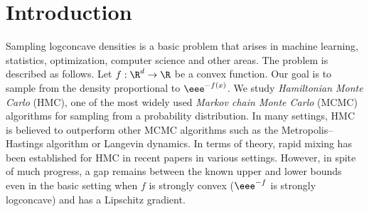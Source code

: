 
%
%
%
















\section{Introduction}

Sampling logconcave densities is a basic problem that arises in machine learning, statistics, optimization, computer science and other areas. The problem is described as follows. Let $f: \R^d \to \R$ be a convex function. Our goal is to sample from the density proportional to $\eee^{-f(x)}$. We study \textit{Hamiltonian Monte Carlo} (HMC), one of the most
%
widely used   %
\textit{Markov chain Monte Carlo} (MCMC) algorithms for sampling from a probability distribution. In many settings, HMC is believed to outperform other MCMC algorithms such as the Metropolis--Hastings algorithm or Langevin dynamics. 
In terms of theory, rapid mixing has been established for HMC in recent papers \cite{LSV18,LV18,MS17,MS19,MV18}
%
in  %
various settings. However, in spite of much progress,
%
a gap remains %
between
the  %
known upper and lower bounds even in the basic setting when $f$ is strongly convex ($\eee^{-f}$ is strongly logconcave) and has a Lipschitz gradient.  

%

